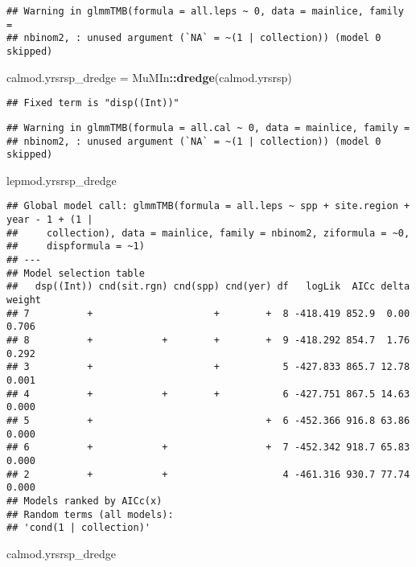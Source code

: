 \documentclass[]{article}
\newenvironment{Shaded}{\begin{snugshade}}{\end{snugshade}}
\newcommand{\KeywordTok}[1]{\textcolor[rgb]{0.13,0.29,0.53}{\textbf{#1}}}
\newcommand{\StringTok}[1]{\textcolor[rgb]{0.31,0.60,0.02}{#1}}
\newcommand{\OperatorTok}[1]{\textcolor[rgb]{0.81,0.36,0.00}{\textbf{#1}}}
\newcommand{\NormalTok}[1]{#1}
\begin{document}
\begin{verbatim}
## Warning in glmmTMB(formula = all.leps ~ 0, data = mainlice, family =
## nbinom2, : unused argument (`NA` = ~(1 | collection)) (model 0 skipped)
\end{verbatim}

\begin{Shaded}
\begin{Highlighting}[]
\NormalTok{calmod.yrsrsp_dredge =}\StringTok{ }\NormalTok{MuMIn}\OperatorTok{::}\KeywordTok{dredge}\NormalTok{(calmod.yrsrsp)}
\end{Highlighting}
\end{Shaded}

\begin{verbatim}
## Fixed term is "disp((Int))"
\end{verbatim}

\begin{verbatim}
## Warning in glmmTMB(formula = all.cal ~ 0, data = mainlice, family =
## nbinom2, : unused argument (`NA` = ~(1 | collection)) (model 0 skipped)
\end{verbatim}

\begin{Shaded}
\begin{Highlighting}[]
\NormalTok{lepmod.yrsrsp_dredge}
\end{Highlighting}
\end{Shaded}

\begin{verbatim}
## Global model call: glmmTMB(formula = all.leps ~ spp + site.region + year - 1 + (1 | 
##     collection), data = mainlice, family = nbinom2, ziformula = ~0, 
##     dispformula = ~1)
## ---
## Model selection table 
##   dsp((Int)) cnd(sit.rgn) cnd(spp) cnd(yer) df   logLik  AICc delta weight
## 7          +                     +        +  8 -418.419 852.9  0.00  0.706
## 8          +            +        +        +  9 -418.292 854.7  1.76  0.292
## 3          +                     +           5 -427.833 865.7 12.78  0.001
## 4          +            +        +           6 -427.751 867.5 14.63  0.000
## 5          +                              +  6 -452.366 916.8 63.86  0.000
## 6          +            +                 +  7 -452.342 918.7 65.83  0.000
## 2          +            +                    4 -461.316 930.7 77.74  0.000
## Models ranked by AICc(x) 
## Random terms (all models): 
## 'cond(1 | collection)'
\end{verbatim}

\begin{Shaded}
\begin{Highlighting}[]
\NormalTok{calmod.yrsrsp_dredge}
\end{Highlighting}
\end{Shaded}
\end{document}
